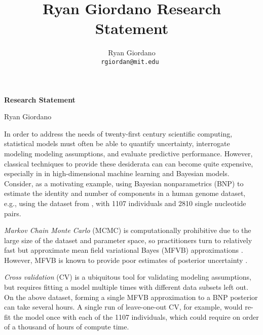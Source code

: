 
\usepackage{enumitem}

\usepackage{geometry}
\geometry{top=1.in}
\geometry{left=1.5in}
\geometry{right=1.5in}

\title{Ryan Giordano Research Statement}

\author{
  Ryan Giordano \\ \texttt{rgiordan@mit.edu }
}



\begin{minipage}[t]{0.5\textwidth}
\hspace{-2em} %
{\bf \LARGE Research Statement}\\
\end{minipage}
\begin{minipage}[t]{0.5\textwidth}
        \hspace{7.5em} %
        {\LARGE Ryan Giordano}
\end{minipage}


In order to address the needs of twenty-first century scientific computing,
statistical models must often be able to quantify uncertainty, interrogate
modeling modeling assumptions, and evaluate predictive performance. However,
classical techniques to provide these desiderata can can become quite expensive,
especially in in high-dimensional machine learning and Bayesian models.
%
Consider, as a motivating example, using Bayesian nonparametrics (BNP)  to
estimate the identity and number of components in a human genome dataset, e.g.,
using the dataset from \citet{huang:2011:haplotype}, with 1107 individuals and
2810 single nucleotide pairs.

{\em Markov Chain Monte Carlo} (MCMC) is
computationally prohibitive due to the large size of the dataset and parameter
space, so practitioners turn to relatively fast but approximate mean field
variational Bayes (MFVB) approximations \citep{blei:2006:bnp,
raj:2014:faststructure}. However, MFVB is known to provide poor estimates of
posterior uncertainty \citep{turner:2011:two}.

{\em Cross validation} (CV) is a ubiquitous tool for validating modeling
assumptions, but requires fitting a model multiple times with different data
subsets left out.  On the above dataset, forming a single MFVB approximation to
a BNP posterior can take several hours.  A single run of leave-one-out CV, for
example, would re-fit the model once with each of the 1107 individuals, which
could require on order of a thousand of hours of compute time.

